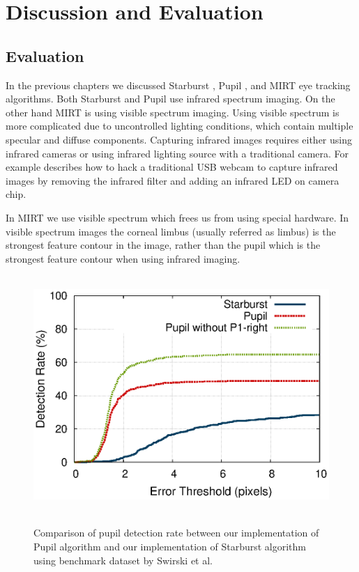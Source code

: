 \chapter{Discussion and Evaluation} 
\label{ch_eye_tr_discussion}
\section{Evaluation}
In the previous chapters we discussed Starburst \cite{starburst}, Pupil \cite{pupil}, and MIRT eye tracking algorithms. Both Starburst and Pupil use infrared spectrum imaging. On the other hand MIRT is using visible spectrum imaging. Using visible spectrum is more complicated due to uncontrolled lighting conditions, which contain multiple specular and diffuse components. Capturing infrared images requires either using infrared cameras or using infrared lighting source with a traditional camera. For example \cite{scriptwear} describes  how to hack a traditional USB webcam to capture infrared images by removing the infrared filter and adding an infrared LED on camera chip. \bigskip

In MIRT we use visible spectrum which frees us from using special hardware. In visible spectrum images the corneal limbus (usually referred as limbus) is the strongest feature contour in the image, rather than the pupil which is the strongest feature contour when using infrared imaging. \bigskip

\begin{figure}[!h]
\begin{dBox}
\centering
	\mbox{
		\includegraphics[width=\textwidth]{./Pictures/evaluation/error.eps}
	}
   \caption{Comparison of pupil detection rate between our implementation of Pupil algorithm and our implementation of Starburst algorithm using benchmark dataset by Swirski et al.\label{fig:our_eval} }   
\end{dBox}   
\end{figure}

